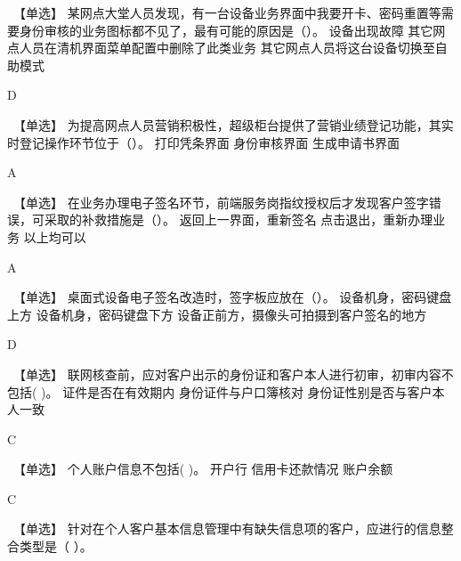 \documentclass[kindlepaper]{BHCexam4kindle}
\begin{document}
\begin{questions}
\qs　【单选】 某网点大堂人员发现，有一台设备业务界面中我要开卡、密码重置等需要身份审核的业务图标都不见了，最有可能的原因是（）。 \xx
{} {  设备出现故障 } { 其它网点人员在清机界面菜单配置中删除了此类业务 } { 其它网点人员将这台设备切换至自助模式 }
\begin{solution} D \end{solution}
\qs　【单选】 为提高网点人员营销积极性，超级柜台提供了营销业绩登记功能，其实时登记操作环节位于（）。 \xx
{} {  打印凭条界面 } { 身份审核界面 } { 生成申请书界面 }
\begin{solution} A \end{solution}
\qs　【单选】 在业务办理电子签名环节，前端服务岗指纹授权后才发现客户签字错误，可采取的补救措施是（）。 \xx
{} {  返回上一界面，重新签名 } { 点击退出，重新办理业务 } { 以上均可以 }
\begin{solution} A \end{solution}
\qs　【单选】 桌面式设备电子签名改造时，签字板应放在（）。 \xx
{} {  设备机身，密码键盘上方 } { 设备机身，密码键盘下方 } { 设备正前方，摄像头可拍摄到客户签名的地方 }
\begin{solution} D \end{solution}
\qs　【单选】 联网核查前，应对客户出示的身份证和客户本人进行初审，初审内容不包括(    )。 \xx
{} {  证件是否在有效期内 } { 身份证件与户口簿核对 } { 身份证性别是否与客户本人一致 }
\begin{solution} C \end{solution}
\qs　【单选】 个人账户信息不包括(    )。 \xx
{} {  开户行 } { 信用卡还款情况 } { 账户余额 }
\begin{solution} C  \end{solution}
\qs　【单选】 针对在个人客户基本信息管理中有缺失信息项的客户，应进行的信息整合类型是（   ）。 \xx

\end{questions}
\end{document}
